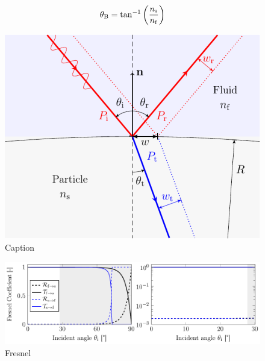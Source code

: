 \begin{equation}
  \theta_{\mathrm{B}} = \tan^{-1}\left( \frac{n_{\mathrm{s}}}{n_{\mathrm{f}}} \right)
  \label{eq:Th-brewster}
\end{equation}

\lipsum[1-2]

\begin{figure}[htp]
  \centering
  \includegraphics[]{Plots/cache/Snell.pdf}
  \caption{Caption}
  \label{fig:Th-snell}
\end{figure}


\lipsum[1-2]

\begin{figure}[htp]
  \centering
  \includegraphics[]{Plots/cache/Fresnel.pdf}
  \caption{Fresnel}
  \label{fig:Th-fresnel}
\end{figure}

\lipsum[1-2]

